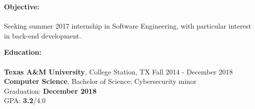 \documentclass[12pt]{article}
\begin{document}
\begin{flushleft}
  \begin{outline}%

    \newlength{\upspacelength}
    \setlength{\upspacelength}{-0.6px}
    \newcommand{\upspace}{\vspace{\upspacelength}}
    \newcommand{\zzz}[1]{\upspace \0 \textbf{#1} \\ \vspace{-0.8\baselineskip} \hrulefill \vspace{-2px} \\ }
    \let\oldOne\1\let\oldTwo\2\let\oldThree\3\let\oldFour\4
    \renewcommand{\1}{\upspace \oldOne  }
    \renewcommand{\2}{\upspace \oldTwo  }
    \renewcommand{\3}{\upspace \oldThree}
    \renewcommand{\4}{\upspace \oldFour }


    \zzz{Objective:}
    \1 Seeking summer 2017 internship in Software Engineering, with particular interest in back-end development.

    \zzz{Education:}
    \1 \textbf{Texas A\&M University}, College Station, TX \hfill Fall 2014 - December 2018
    \\ \textbf{Computer Science}, Bachelor of Science; Cybersecurity minor
    \\ Graduation: \textbf{December 2018}
    \\ GPA:  \textbf{3.2}/4.0


\end{outline}
\end{flushleft}
\end{document}
